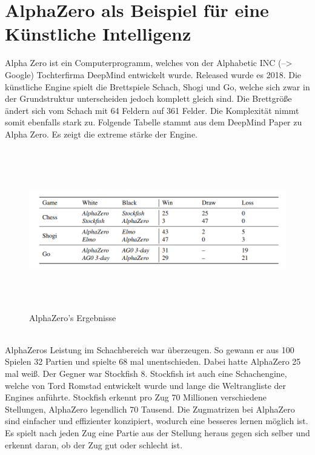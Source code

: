 \section{AlphaZero als Beispiel für eine Künstliche Intelligenz}
Alpha Zero ist ein Computerprogramm, welches von der Alphabetic INC (--> Google) Tochterfirma DeepMind entwickelt wurde. Released wurde es 2018. Die künstliche Engine spielt die Brettspiele Schach, Shogi und Go, welche sich zwar in der Grundstruktur unterscheiden jedoch komplett gleich sind. Die Brettgröße ändert sich vom Schach mit 64 Feldern auf 	361 Felder. Die Komplexität nimmt somit ebenfalls stark zu. Folgende Tabelle stammt aus dem DeepMind Paper zu Alpha Zero. Es zeigt die extreme stärke der Engine. ~\cite{deepmind2018}
\\
\begin{figure}[h]
	\centering
	\includegraphics[width=16cm,height=7cm]{table.png}
	\caption{AlphaZero's Ergebnisse}
	\label{img:passante}
\end{figure}
\\
AlphaZeros Leistung im Schachbereich war überzeugen. So gewann er aus 100 Spielen 32 Partien und spielte 68 mal unentschieden. Dabei hatte AlphaZero 25 mal weiß. Der Gegner war Stockfish 8. Stockfish ist auch eine Schachengine, welche von Tord Romstad entwickelt wurde und lange die Weltrangliste der Engines anführte. Stockfish erkennt pro Zug 70 Millionen verschiedene Stellungen, AlphaZero legendlich 70 Tausend. Die Zugmatrizen bei AlphaZero sind einfacher und effizienter konzipiert, wodurch eine besseres lernen möglich ist. Es spielt nach jeden Zug eine Partie aus der Stellung heraus gegen sich selber und erkennt daran, ob der Zug \dq gut\dq\vspace{10px} oder \dq schlecht \dq ist. 
